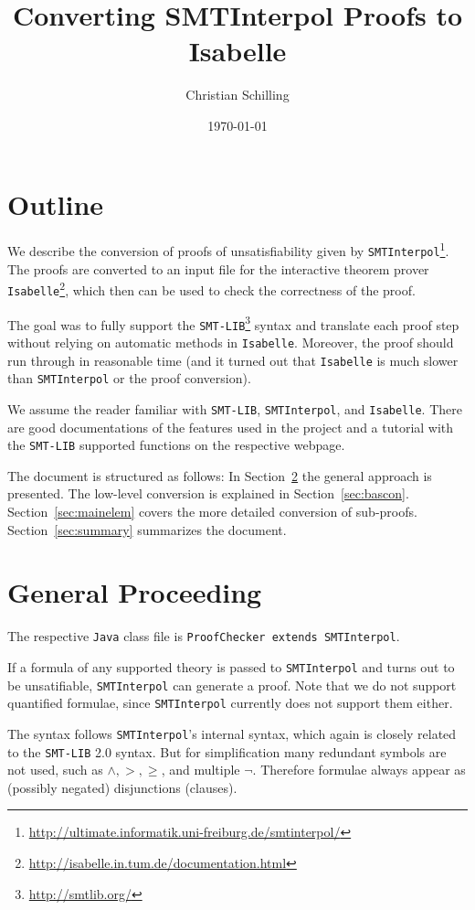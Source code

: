 \documentclass[10pt,a4paper]{article}
\title{Converting SMTInterpol Proofs to Isabelle}
\author{Christian Schilling}
\date{\today}
\newcommand{\si}{\texttt{SMTInterpol}\xspace}
\newcommand{\isa}{\texttt{Isabelle}\xspace}
\newcommand{\slib}{\texttt{SMT-LIB}\xspace}
\newcommand{\jav}{\texttt{Java}\xspace}
\newcommand{\ttt}{\texttt}
\begin{document}
\maketitle
\tableofcontents
%
\section{Outline}
%
We describe the conversion of proofs of unsatisfiability given by \si\footnote{\url{http://ultimate.informatik.uni-freiburg.de/smtinterpol/}}. The proofs are converted to an input file for the interactive theorem prover \isa\footnote{\url{http://isabelle.in.tum.de/documentation.html}}, which then can be used to check the correctness of the proof.

The goal was to fully support the \slib\footnote{\url{http://smtlib.org/}} syntax and translate each proof step without relying on automatic methods in \isa. Moreover, the proof should run through in reasonable time (and it turned out that \isa is much slower than \si or the proof conversion).

We assume the reader familiar with \slib, \si, and \isa. There are good documentations of the features used in the project  \cite{smtlibStandard, isabelle} and a tutorial with the \slib supported functions \cite{smtlibTutorial} on the respective webpage.

The document is structured as follows: In Section~\ref{sec:genproc} the general approach is presented. The low-level conversion is explained in Section~\ref{sec:bascon}. Section~\ref{sec:mainelem} covers the more detailed conversion of sub-proofs. Section~\ref{sec:summary} summarizes the document.
%
\section{General Proceeding}\label{sec:genproc}
%
The respective \jav class file is \ttt{ProofChecker extends SMTInterpol}.

\medskip

If a formula of any supported theory is passed to \si and turns out to be unsatifiable, \si can generate a proof. Note that we do not support quantified formulae, since \si currently does not support them either.

The syntax follows \si's internal syntax, which again is closely related to the \slib 2.0 syntax. But for simplification many redundant symbols are not used, such as $\land, >,\geq$, and multiple $\neg$. Therefore formulae always appear as (possibly negated) disjunctions (clauses).
\end{document}
